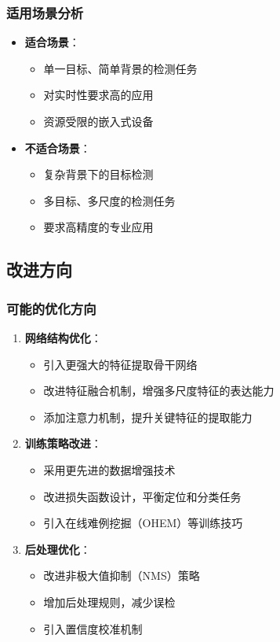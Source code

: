 \documentclass[UTF8]{ctexart}
\begin{document}
\subsubsection{适用场景分析}
\begin{itemize}
    \item \textbf{适合场景}：
    \begin{itemize}
        \item 单一目标、简单背景的检测任务
        \item 对实时性要求高的应用
        \item 资源受限的嵌入式设备
    \end{itemize}
    
    \item \textbf{不适合场景}：
    \begin{itemize}
        \item 复杂背景下的目标检测
        \item 多目标、多尺度的检测任务
        \item 要求高精度的专业应用
    \end{itemize}
\end{itemize}

\subsection{改进方向}

\subsubsection{可能的优化方向}
\begin{enumerate}
    \item \textbf{网络结构优化}：
    \begin{itemize}
        \item 引入更强大的特征提取骨干网络
        \item 改进特征融合机制，增强多尺度特征的表达能力
        \item 添加注意力机制，提升关键特征的提取能力
    \end{itemize}
    
    \item \textbf{训练策略改进}：
    \begin{itemize}
        \item 采用更先进的数据增强技术
        \item 改进损失函数设计，平衡定位和分类任务
        \item 引入在线难例挖掘（OHEM）等训练技巧
    \end{itemize}
    
    \item \textbf{后处理优化}：
    \begin{itemize}
        \item 改进非极大值抑制（NMS）策略
        \item 增加后处理规则，减少误检
        \item 引入置信度校准机制
    \end{itemize}
\end{enumerate}
\end{document}
